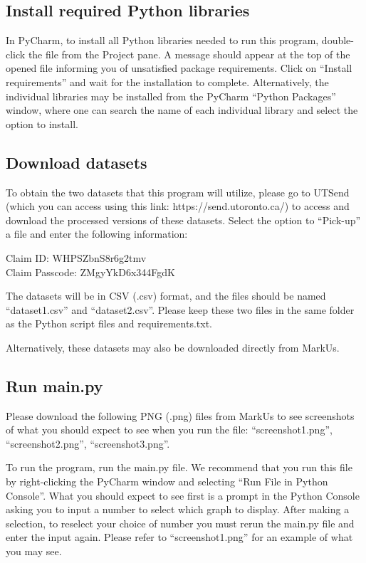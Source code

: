 \documentclass[fontsize=11pt]{article}
\begin{document}
\subsection*{Install required Python libraries}
In PyCharm, to install all Python libraries needed to run this program, double-click the file from the Project pane. A message should appear at the top of the opened file informing you of unsatisfied package requirements. Click on “Install requirements” and wait for the installation to complete. Alternatively, the individual libraries may be installed from the PyCharm “Python Packages” window, where one can search the name of each individual library and select the option to install.

\subsection*{Download datasets}
To obtain the two datasets that this program will utilize, please go to UTSend (which you can access using this link: https://send.utoronto.ca/) to access and download the processed versions of these datasets. Select the option to “Pick-up” a file and enter the following information:


Claim ID: WHPSZbnS8r6g2tmv\\
Claim Passcode: ZMgyYkD6x344FgdK
    
    
The datasets will be in CSV (.csv) format, and the files should be named “dataset1.csv” and “dataset2.csv”. Please keep these two files in the same folder as the Python script files and requirements.txt.

Alternatively, these datasets may also be downloaded directly from MarkUs.

\subsection*{Run main.py}
Please download the following PNG (.png) files from MarkUs to see screenshots of what you should expect to see when you run the file: “screenshot1.png”, “screenshot2.png”, “screenshot3.png”.

\noindent
To run the program, run the main.py file. We recommend that you run this file by right-clicking the PyCharm window and selecting “Run File in Python Console”. What you should expect to see first is a prompt in the Python Console asking you to input a number to select which graph to display. After making a selection, to reselect your choice of number you must rerun the main.py file and enter the input again. Please refer to “screenshot1.png” for an example of what you may see.
\end{document}
